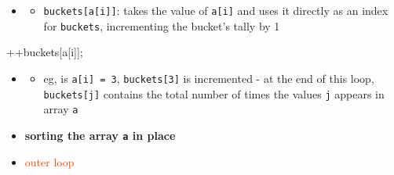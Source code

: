 \begin{mybox}[OrangeRed]{}
    \noindent   
    \begin{minipage}{0.47\textwidth}
        \begin{itemize}
            \item[]{}
                \begin{itemize}
                    \item \texttt{buckets[a[i]]}: takes the value of \texttt{a[i]} and uses it directly as an index for \texttt{buckets}, incrementing the bucket's tally by 1
                \end{itemize}
        \end{itemize}
    \end{minipage}
    \begin{minipage}{0.03\textwidth}
        \phantom{text}
    \end{minipage}
    \begin{minipage}{0.5\textwidth}
        \begin{tightcode}
++buckets[a[i]];
        \end{tightcode}
    \end{minipage}

    \begin{itemize}
        \item []{}
            \begin{itemize}
                \item eg, is \texttt{a[i] = 3}, \texttt{buckets[3]} is incremented - at the end of this loop, \texttt{buckets[j]} contains the total number of times the values \texttt{j} appears in array \texttt{a}
            \end{itemize}
    \end{itemize}
    
    \noindent
    \begin{minipage}{0.5\textwidth}
        \begin{itemize}
            \item[] \textbf{sorting the array \texttt{a} in place}
            \item [] \textcolor{OrangeRed}{outer loop}
        \end{itemize}
    \end{minipage}
    \begin{minipage}{0.5\textwidth}
        \begin{tightcode}
for(int i = 0, j = 0; j < m; ++j) {
        \end{tightcode}
    \end{minipage}


\end{mybox}
